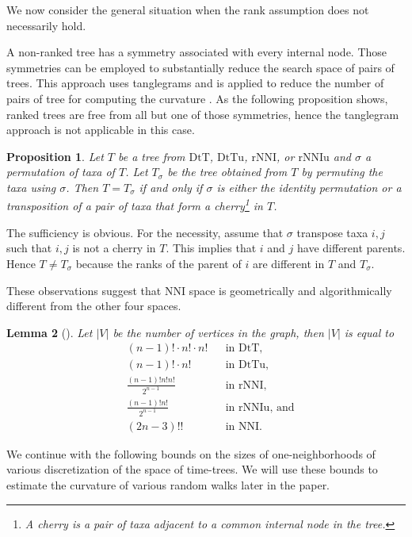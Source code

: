 \documentclass{amsart}
\newtheorem{lemma}{Lemma}
\newtheorem{proposition}[lemma]{Proposition}
\theoremstyle{definition}
\newcommand{\nni}{\mathrm{NNI}}
\newcommand{\rnni}{\mathrm{rNNI}}
\newcommand{\rnniu}{\mathrm{rNNIu}}
\newcommand{\mdts}{\mathrm{DtT}}
\newcommand{\mdtsu}{\mathrm{DtTu}}
\begin{document}
We now consider the general situation when the rank assumption does not necessarily hold.
\endproof

A non-ranked tree has a symmetry associated with every internal node.
Those symmetries can be employed to substantially reduce the search space of pairs of trees.
This approach uses tanglegrams \autocite{Matsen2015-fn} and is applied to reduce the number of pairs of tree for computing the curvature \autocite{Whidden2015-es}.
As the following proposition shows, ranked trees are free from all but one of those symmetries, hence the tanglegram approach is not applicable in this case.

\begin{proposition}
Let $T$ be a tree from $\mdts$, $\mdtsu$, $\rnni$, or $\rnniu$ and $\sigma$ a permutation of taxa of $T$.
Let $T_\sigma$ be the tree obtained from $T$ by permuting the taxa using $\sigma$.
Then $T = T_\sigma$ if and only if $\sigma$ is either the identity permutation or a transposition of a pair of taxa that form a
cherry\footnote{A {\em cherry} is a pair of taxa adjacent to a common internal node in the tree.}
in $T$.
\end{proposition}

\proof
The sufficiency is obvious.
For the necessity, assume that $\sigma$ transpose taxa $i,j$ such that $i,j$ is not a cherry in $T$.
This implies that $i$ and $j$ have different parents.
Hence $T \ne T_\sigma$ because the ranks of the parent of $i$ are different in $T$ and $T_\sigma$.
\endproof

These observations suggest that $\nni$ space is geometrically and algorithmically different from the other four spaces.

\begin{lemma}[\textcite{Semple2003-nj}]\label{spaceSizes}
Let $|V|$ be the number of vertices in the graph, then $|V|$ is equal to
\begin{align*}
& (n-1)! \cdot n! \cdot n!	&& \mbox{in $\mdts$,}\\
& (n-1)! \cdot n!		&& \mbox{in $\mdtsu$,}\\
& \frac{(n-1)!n!n!}{2^{n-1}}	&& \mbox{in $\rnni$,}\\
& \frac{(n-1)!n!}{2^{n-1}}	&& \mbox{in $\rnniu$, and}\\
& (2n - 3)!!			&& \mbox{in $\nni$.}
\end{align*}
\end{lemma}

We continue with the following bounds on the sizes of one-neighborhoods of various discretization of the space of time-trees.
We will use these bounds to estimate the curvature of various random walks later in the paper.
\end{document}
